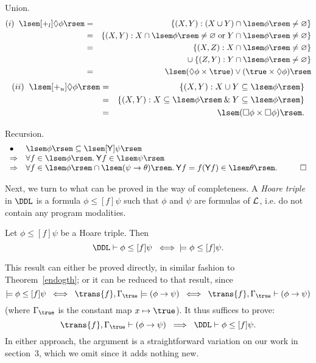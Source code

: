 Union.
\begin{eqnarray*}
(i) \;\; \lsem [+_{l}] \Diamond \phi \rsem & = &
\{ (X, Y) : (X \cup Y) \cap \lsem \phi \rsem \not= \varnothing \} \\
& = & \{ (X, Y) : X \cap \lsem \phi \rsem \not= \varnothing \; \mbox{or} \;
Y \cap \lsem \phi \rsem \not= \varnothing \} \\
& = & \{ (X, Z) : X \cap \lsem \phi \rsem \not= \varnothing \} \\
&   & \mbox{} \cup \{ (Z, Y) : Y \cap \lsem \phi \rsem \not= \varnothing \} \\
& = & \lsem (\Diamond \phi \times \true ) \vee (\true \times \Diamond \phi ) \rsem
\end{eqnarray*}
\begin{eqnarray*}
(ii) \;\; \lsem [+_{u}]\Diamond \phi \rsem & = &
\{ (X, Y) : X \cup Y \subseteq \lsem \phi \rsem \} \\
& = & \{ (X, Y) : X \subseteq \lsem \phi \rsem \: \& \: Y \subseteq \lsem \phi \rsem \} \\
& = & \lsem (\Box \phi \times \Box \phi ) \rsem .
\end{eqnarray*}

Recursion.
\[ \begin{array}{ll}
\bullet & \lsem \phi \rsem \subseteq \lsem [{\sf Y}]\psi \rsem \\
\Rightarrow & \forall f \in \lsem \phi \rsem . \: {\sf Y}f \in \lsem \psi \rsem \\
\Rightarrow & \forall f \in \lsem \phi \rsem \cap \lsem (\psi \rightarrow \theta ) \rsem . \: {\sf Y}f = f ({\sf Y} f) \in \lsem \theta \rsem . \;\;\; \qed
\end{array}  \]

Next, we turn to what can be proved in the way of completeness.
A {\em Hoare triple} in $\DDL$ is a formula $\phi \leq [f]\psi$
such that $\phi$ and $\psi$ are formulas of $\cal L$, i.e. do not contain any program modalities.
\begin{theorem}
\label{Htrip}
Let $\phi \leq [f]\psi$ be a Hoare triple. Then
\[ \DDL \vdash \phi \leq [f]\psi \;\; \Longleftrightarrow \;\; \models \phi \leq [f]\psi. \]
\end{theorem}
This result can either be proved directly, in similar fashion to Theorem~\ref{endogth}; or it can be reduced to that result, since
\[ \models \phi \leq [f]\psi \;\; \Longleftrightarrow \;\;
\trans{f}, \Gamma_{\true} \models (\phi \rightarrow \psi ) \;\; 
\Longleftrightarrow \;\; \trans{f}, \Gamma_{\true} \vdash (\phi \rightarrow \psi ) \]
(where $\Gamma_{\true}$ is the constant map $x \mapsto \true$).
It thus suffices to prove:
\[ \trans{f}, \Gamma_{\true} \vdash (\phi \rightarrow \psi ) \;\; \Longrightarrow \;\; \DDL \vdash \phi \leq [f]\psi . \]
In either approach, the argument is a straightforward variation on our work in
section~3, which we omit since it adds nothing new.

